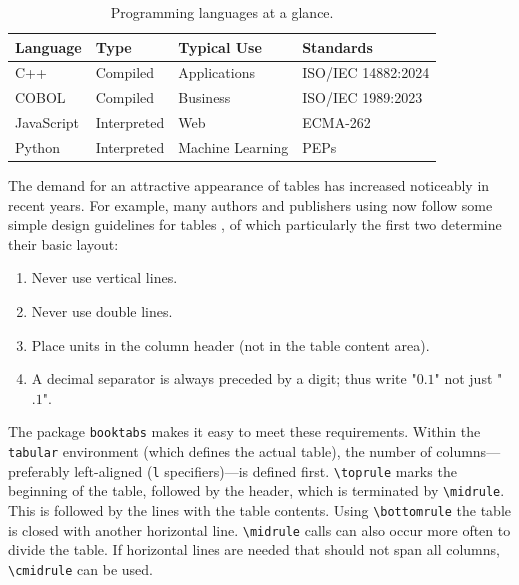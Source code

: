 \begin{program}
    \caption{\latex\ source code for Table \ref{tab:programming-languages}.
    The generation of the displayed listing itself is described in
    Section~\ref{sec:program-texts}.}
    \label{prog:programming-languages-source}
%
\begin{LaTeXCode}[numbers=none]
\begin{table}
    \caption{Programming languages at a glance.}
    \label{tab:programming-languages}
    \centering
    \setlength{\tabcolsep}{10pt} %
    \renewcommand{\arraystretch}{1.25} %
    \begin{tabular}{@{}llll@{}}
        \toprule
        Language   & Type        & Typical Use      & Standards          \\
        \midrule
        C++        & Compiled    & Applications     & ISO/IEC 14882:2024 \\
        COBOL      & Compiled    & Business         & ISO/IEC 1989:2023  \\
        JavaScript & Interpreted & Web              & ECMA-262           \\
        Python     & Interpreted & Machine Learning & PEPs               \\
        \bottomrule
    \end{tabular}
\end{table}
\end{LaTeXCode}
%
\end{program}

The demand for an attractive appearance of tables has increased noticeably in
recent years. For example, many authors and publishers using \latex now
follow some simple design guidelines for tables \cite{Fear2020}, of which
particularly the first two determine their basic layout:

\begin{enumerate}
    \item Never use vertical lines.
    \item Never use double lines.
    \item Place units in the column header (not in the table content area).
    \item A decimal separator is always preceded by a digit; thus write
    "$0.1$" not just "$.1$".
\end{enumerate}


The \latex package \texttt{booktabs} makes it easy to meet these requirements.
Within the \texttt{tabular} environment (which defines the actual table), the
number of columns---preferably left-aligned (\texttt{l}
specifiers)---is defined first. \verb|\toprule| marks the beginning of the
table, followed by the header, which is terminated by \verb|\midrule|. This is
followed by the lines with the table contents. Using \verb|\bottomrule| the
table is closed with another horizontal line. \verb|\midrule| calls can also
occur more often to divide the table. If horizontal lines are needed that should
not span all columns, \verb|\cmidrule| can be used.

